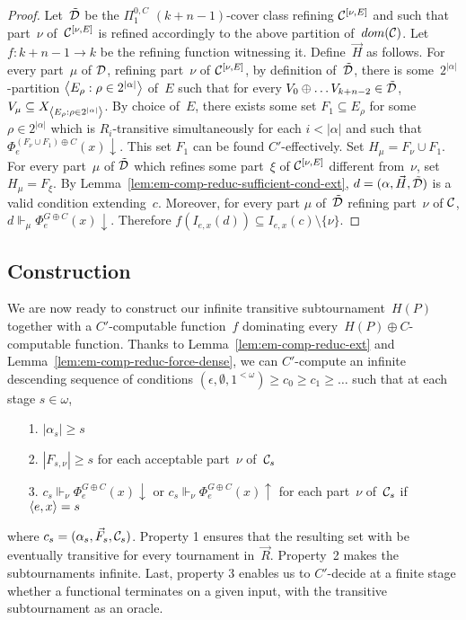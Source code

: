 \begin{proof}
Let~$\tilde{\mathcal{D}}$ be the $\Pi^{0,C}_1$ $(k+n-1)$-cover class refining $\mathcal{C}^{[\nu, E]}$
and such that part~$\nu$ of~$\mathcal{C}^{[\nu, E]}$ is refined accordingly to the above partition of~$dom(\mathcal{C})$.
Let~$f : k+n-1 \to k$ be the refining function witnessing it. 
Define~$\vec{H}$ as follows. For every part~$\mu$ of $\mathcal{D}$, refining part~$\nu$ of $\mathcal{C}^{[\nu, E]}$,
by definition of~$\tilde{\mathcal{D}}$, there is some~$2^{|\alpha|}$-partition $\left\langle E_\rho : \rho \in 2^{|\alpha|} \right\rangle$ of~$E$
such that for every $V_0 \oplus \dots V_{k+n-2} \in \tilde{\mathcal{D}}$, $V_\mu \subseteq X_{\left\langle E_\rho : \rho \in 2^{|\alpha|} \right\rangle}$.
By choice of~$E$, there exists some set $F_1 \subseteq E_\rho$ for some~$\rho \in 2^{|\alpha|}$
which is $R_i$-transitive simultaneously for each $i < |\alpha|$ and such that
$\Phi_e^{(F_\nu \cup F_1) \oplus C}(x) \downarrow$.
This set $F_1$ can be found $C'$-effectively. Set $H_\mu = F_\nu \cup F_1$.
For every part~$\mu$ of $\tilde{\mathcal{D}}$ which refines some part~$\xi$ of $\mathcal{C}^{[\nu, E]}$ different from~$\nu$,
set~$H_\mu = F_\xi$.
By Lemma~\ref{lem:em-comp-reduc-sufficient-cond-ext}, $d = (\alpha, \vec{H}, \tilde{\mathcal{D}})$ is a valid condition
extending~$c$. Moreover, for every part $\mu$ of~$\tilde{\mathcal{D}}$ refining part~$\nu$ of $\mathcal{C}$,
$d \Vdash_\mu \Phi_e^{G \oplus C}(x) \downarrow$. Therefore $f(I_{e,x}(d)) \subseteq I_{e,x}(c) \setminus \{\nu\}$.
\end{proof}


\subsection{Construction}

We are now ready to construct our infinite transitive subtournament~$H(P)$ together
with a $C'$-computable function~$f$ dominating every~$H(P) \oplus C$-computable function.
Thanks to Lemma~\ref{lem:em-comp-reduc-ext} and Lemma~\ref{lem:em-comp-reduc-force-dense}, we can $C'$-compute an infinite
descending sequence of conditions $(\epsilon, \emptyset, 1^{<\omega}) \geq c_0 \geq c_1 \geq \dots$
such that at each stage $s \in \omega$,
\begin{itemize}
	\item[1.] $|\alpha_s| \geq s$
	\item[2.] $|F_{s, \nu}| \geq s$ for each acceptable part~$\nu$ of~$\mathcal{C}_s$
	\item[3.] $c_s \Vdash_\nu \Phi_e^{G \oplus C}(x) \downarrow$ or $c_s \Vdash_\nu \Phi_e^{G \oplus C}(x) \uparrow$
	for each part~$\nu$ of~$\mathcal{C}_s$ if $\left\langle e, x \right\rangle = s$
\end{itemize}
where $c_s = (\alpha_s, \vec{F}_s, \mathcal{C}_s)$.
Property 1 ensures that the resulting set with be eventually transitive
for every tournament in~$\vec{R}$. Property~2 makes the subtournaments infinite.
Last, property 3 enables us to $C'$-decide at a finite stage whether a functional terminates on a given
input, with the transitive subtournament as an oracle.

